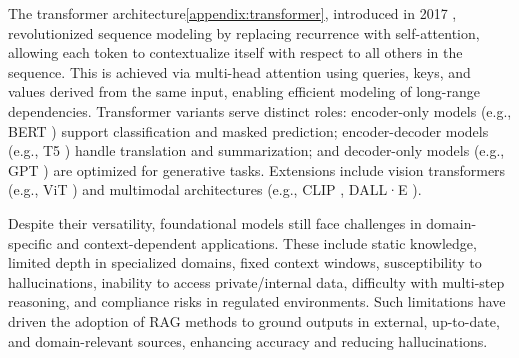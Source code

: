\documentclass[12pt,twoside]{report}
\begin{document}

The transformer architecture\ref{appendix:transformer}, introduced in 2017 \cite{AttentionIsAllYouNeed}, revolutionized sequence modeling by replacing recurrence with self-attention, allowing each token to contextualize itself with respect to all others in the sequence. This is achieved via multi-head attention using queries, keys, and values derived from the same input, enabling efficient modeling of long-range dependencies. Transformer variants serve distinct roles: encoder-only models (e.g., BERT \cite{BERT}) support classification and masked prediction; encoder-decoder models (e.g., T5 \cite{T5}) handle translation and summarization; and decoder-only models (e.g., GPT \cite{GPT}) are optimized for generative tasks. Extensions include vision transformers (e.g., ViT \cite{ViT}) and multimodal architectures (e.g., CLIP \cite{CLIP}, DALL·E \cite{DALL.E-2}).

Despite their versatility, foundational models still face challenges in domain-specific and context-dependent applications. These include static knowledge, limited depth in specialized domains, fixed context windows, susceptibility to hallucinations, inability to access private/internal data, difficulty with multi-step reasoning, and compliance risks in regulated environments. Such limitations have driven the adoption of RAG methods to ground outputs in external, up-to-date, and domain-relevant sources, enhancing accuracy and reducing hallucinations.
\end{document}
